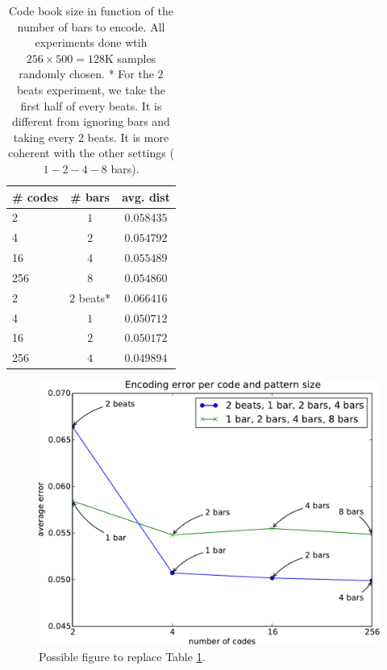 \documentclass{article}
\begin{document}
\begin{table}
\begin{center}
\begin{tabular}{|l|c|c|}
\hline
\# codes & \# bars & avg. dist \\ \hline \hline
2 & $1$ & $0.058435$ \\
4 & $2$ & $0.054792$ \\
16 & $4$ & $0.055489$ \\
256 & $8$ & $0.054860$ \\ \hline
2 & $2$ beats* & $0.066416$ \\
4 & $1$ & $0.050712$ \\
16 & $2$ & $0.050172$ \\
256 & $4$ & $0.049894$ \\ \hline
\end{tabular}
\end{center}
\caption{{Code book size in function of the number of bars to encode.
All experiments done wtih $256 \times 500 = 128$K samples randomly chosen.
* For the $2$ beats experiment, we take the first half of every beats.
It is different from ignoring bars and taking every $2$ beats. It is more
coherent with the other settings ($1-2-4-8$ bars).}}
\label{tab:size_pattern}
\end{table}


\begin{figure}[htb]
\begin{center}
\includegraphics[width=.99\columnwidth]{codesize_patternsize}
\end{center}
\caption{{Possible figure to replace Table \ref{tab:size_pattern}.}}
\label{fig:size_pattern}
\end{figure}
\end{document}
